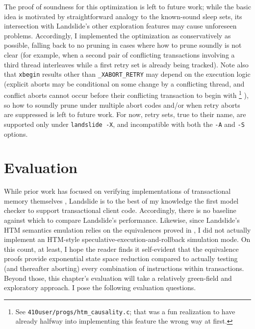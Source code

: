
The proof of soundness for this optimization is left to future work;
while the basic idea is motivated by straightforward analogy to the known-sound sleep sets,
its intersection with Landslide's other exploration features may cause unforeseen problems.
Accordingly, I implemented the optimization as conservatively as possible,
falling back to no pruning in cases where how to prune soundly is not clear
(for example, when a second pair of conflicting transactions involving a third thread
interleaves while a first retry set is already being tracked).
Note also that {\tt xbegin} results other than {\tt \_XABORT\_RETRY}
may depend on the execution logic
(explicit aborts may be conditional on some change by a conflicting thread,
and conflict aborts cannot occur before their conflicting transaction to begin with%
\footnote{See {\tt 410user/progs/htm\_causality.c}; that was a fun realization to have
already halfway into implementing this feature the wrong way at first.}%
),
so how to soundly prune under multiple abort codes
and/or when retry aborts are suppressed is left to future work.
For now, retry sets, true to their name,
are supported only under {\tt landslide -X},
and incompatible with both the {\tt -A} and {\tt -S} options.


\section{Evaluation}

While prior work has focused on verifying implementations of transactional memory themselves
\cite{specifying-verifying-tm,tm-correctness,tm-completeness,mc-tm-with-spin},
Landslide is to the best of my knowledge the first model checker to support transactional client code.
Accordingly, there is no baseline against which to compare Landslide's performance.
Likewise, since Landslide's HTM semantics emulation relies on the equivalences proved in \sect{\ref{sec:tm-design}},
I did not actually implement an HTM-style speculative-execution-and-rollback simulation mode.
On this count, at least,
I hope the reader finds it self-evident that
the equivalence proofs provide exponential state space reduction
compared to actually testing (and thereafter aborting) every combination of instructions within transactions.
Beyond those, this chapter's evaluation will take a relatively green-field and exploratory approach.
I pose the following evaluation questions.

